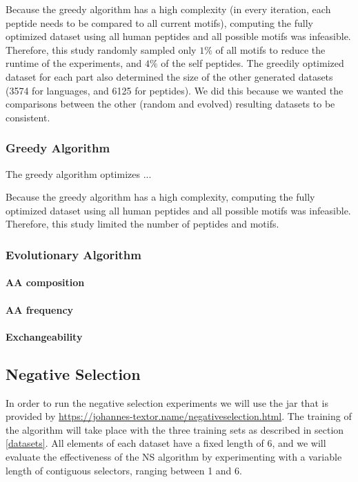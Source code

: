 \documentclass{article}
\begin{document}
Because the greedy algorithm has a high complexity (in every iteration, each peptide needs to be compared to all 
current motifs), computing the fully optimized dataset using all human peptides and all possible motifs was infeasible.
Therefore, this study randomly sampled only $1\%$ of all motifs to reduce the runtime of the experiments, and $4\%$ of 
the self peptides. The greedily optimized dataset for each part also determined the size of the other generated datasets 
(3574 for languages, and 6125 for peptides). We did this because we wanted the comparisons between the other 
(random and evolved) resulting datasets to be consistent.

\subsubsection{Greedy Algorithm}

The greedy algorithm optimizes ...

Because the greedy algorithm has a high complexity, computing the fully optimized dataset using all human peptides and
all possible motifs was infeasible. Therefore, this study limited the number of peptides and motifs.


\subsubsection{Evolutionary Algorithm} 

\paragraph{AA composition}



\paragraph{AA frequency}

\paragraph{Exchangeability}


\subsection{Negative Selection}
In order to run the negative selection experiments we will use the jar that is provided by \url{https://johannes-textor.name/negativeselection.html}.
The training of the algorithm will take place with the three training sets as described in section \ref{datasets}.
All elements of each dataset have a fixed length of 6, and we will evaluate the effectiveness of the NS algorithm by 
experimenting  with a variable length of contiguous selectors, ranging between 1 and 6. 
\end{document}
